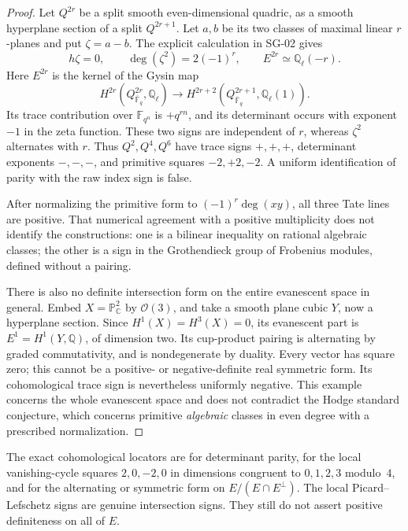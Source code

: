 \documentclass[11pt,a4paper]{article}
\theoremstyle{remark}
\begin{document}
\begin{proof}
Let $Q^{2r}$ be a split smooth even-dimensional quadric, as a smooth hyperplane section of a split $Q^{2r+1}$. Let $a,b$ be its two classes of maximal linear $r$-planes and put $\zeta=a-b$. The explicit calculation in SG-02 gives
\[
 h\zeta=0,\qquad \deg(\zeta^2)=2(-1)^r,
 \qquad E^{2r}\simeq\mathbb Q_\ell(-r).
\]
Here $E^{2r}$ is the kernel of the Gysin map
\[
 H^{2r}(Q^{2r}_{\overline{\mathbb F}_q},\mathbb Q_\ell)
 \longrightarrow H^{2r+2}(Q^{2r+1}_{\overline{\mathbb F}_q},\mathbb Q_\ell(1)).
\]
Its trace contribution over $\mathbb F_{q^n}$ is $+q^{rn}$, and its determinant occurs with exponent $-1$ in the zeta function. These two signs are independent of $r$, whereas $\zeta^2$ alternates with $r$. Thus $Q^2,Q^4,Q^6$ have trace signs $+,+,+$, determinant exponents $-,-,-$, and primitive squares $-2,+2,-2$. A uniform identification of parity with the raw index sign is false.

After normalizing the primitive form to $(-1)^r\deg(xy)$, all three Tate lines are positive. That numerical agreement with a positive multiplicity does not identify the constructions: one is a bilinear inequality on rational algebraic classes; the other is a sign in the Grothendieck group of Frobenius modules, defined without a pairing.

There is also no definite intersection form on the entire evanescent space in general. Embed $X=\mathbb P^2_{\mathbb C}$ by $\mathcal O(3)$, and take a smooth plane cubic $Y$, now a hyperplane section. Since $H^1(X)=H^3(X)=0$, its evanescent part is $E^1=H^1(Y,\mathbb Q)$, of dimension two. Its cup-product pairing is alternating by graded commutativity, and is nondegenerate by duality. Every vector has square zero; this cannot be a positive- or negative-definite real symmetric form. Its cohomological trace sign is nevertheless uniformly negative. This example concerns the whole evanescent space and does not contradict the Hodge standard conjecture, which concerns primitive \emph{algebraic} classes in even degree with a prescribed normalization.
\end{proof}

The exact cohomological locators are \cite[eq.~(1.5.4), p.~276]{WeilI} for determinant parity, \cite[\S4.1, p.~287]{WeilI} for the local vanishing-cycle squares $2,0,-2,0$ in dimensions congruent to $0,1,2,3$ modulo~$4$, and \cite[\S5.9, p.~293]{WeilI} for the alternating or symmetric form on $E/(E\cap E^\perp)$. The local Picard--Lefschetz signs are genuine intersection signs. They still do not assert positive definiteness on all of $E$.
\end{document}
